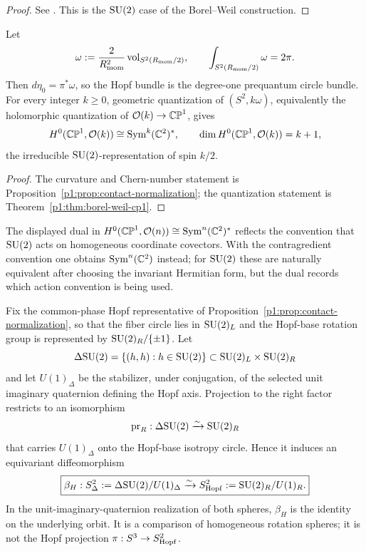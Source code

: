 \documentclass[11pt]{article}
\begin{document}
\begin{proof}
See \cite{Kirillov2004lectures}. This is the \(\mathrm{SU}(2)\) case of the
Borel--Weil construction.
\end{proof}

\begin{corollary}
\label{p1:cor:cp1-geometric-quantization}
Let
\[
  \omega:=\frac{2}{R_{\mathrm{mom}}^2}\operatorname{vol}_{S^2(R_{\mathrm{mom}}/2)},
  \qquad
  \int_{S^2(R_{\mathrm{mom}}/2)}\omega=2\pi.
\]
Then \(d\eta_0=\pi^*\omega\), so the Hopf bundle is the degree-one
prequantum circle bundle.  For every integer \(k\ge0\), geometric
quantization of \((S^2,k\omega)\), equivalently the holomorphic quantization of
\(\mathcal O(k)\to\mathbb{CP}^1\), gives
\[
  H^0(\mathbb{CP}^1,\mathcal O(k))\cong\operatorname{Sym}^k(\mathbb{C}^2)^*,
  \qquad
  \dim H^0(\mathbb{CP}^1,\mathcal O(k))=k+1,
\]
the irreducible \(\mathrm{SU}(2)\)-representation of spin \(k/2\).
\end{corollary}

\begin{proof}
The curvature and Chern-number statement is Proposition~\ref{p1:prop:contact-normalization}; the quantization statement is Theorem~\ref{p1:thm:borel-weil-cp1}.
\end{proof}

\begin{remark}
The displayed dual in \(H^0(\mathbb{CP}^1,\mathcal O(n))\cong\operatorname{Sym}^n(\mathbb{C}^2)^\ast\)
reflects the convention that \(\mathrm{SU}(2)\) acts on homogeneous coordinate
covectors.  With the contragredient convention one obtains \(\operatorname{Sym}^n(\mathbb{C}^2)\)
instead; for \(\mathrm{SU}(2)\) these are naturally equivalent after choosing the
invariant Hermitian form, but the dual records which action convention is being
used.
\end{remark}

\begin{proposition}
\label{p1:prop:hopf-marked-diagonal-base-comparison}
Fix the common-phase Hopf representative of
Proposition~\ref{p1:prop:contact-normalization}, so that the fiber circle lies
in \(\mathrm{SU}(2)_L\) and the Hopf-base rotation group is represented by
\(\mathrm{SU}(2)_R/\{\pm1\}\).  Let
\[
 \Delta\mathrm{SU}(2)=\{(h,h):h\in\mathrm{SU}(2)\}
 \subset \mathrm{SU}(2)_L\times\mathrm{SU}(2)_R
\]
and let \(U(1)_\Delta\) be the stabilizer, under conjugation, of the selected
unit imaginary quaternion defining the Hopf axis.  Projection to the right
factor restricts to an isomorphism
\[
 \operatorname{pr}_R:\Delta\mathrm{SU}(2)\xrightarrow{\sim}\mathrm{SU}(2)_R
\]
that carries \(U(1)_\Delta\) onto the Hopf-base isotropy circle.  Hence it
induces an equivariant diffeomorphism
\[
 \boxed{\beta_H:
 S^2_\Delta:=\Delta\mathrm{SU}(2)/U(1)_\Delta
 \xrightarrow{\sim}
 S^2_{\rm Hopf}:=\mathrm{SU}(2)_R/U(1)_R.}
\]
In the unit-imaginary-quaternion realization of both spheres, \(\beta_H\) is
the identity on the underlying orbit.  It is a comparison of homogeneous
rotation spheres; it is not the Hopf projection \(\pi:S^3\to S^2_{\rm Hopf}\).
\end{proposition}
\end{document}
